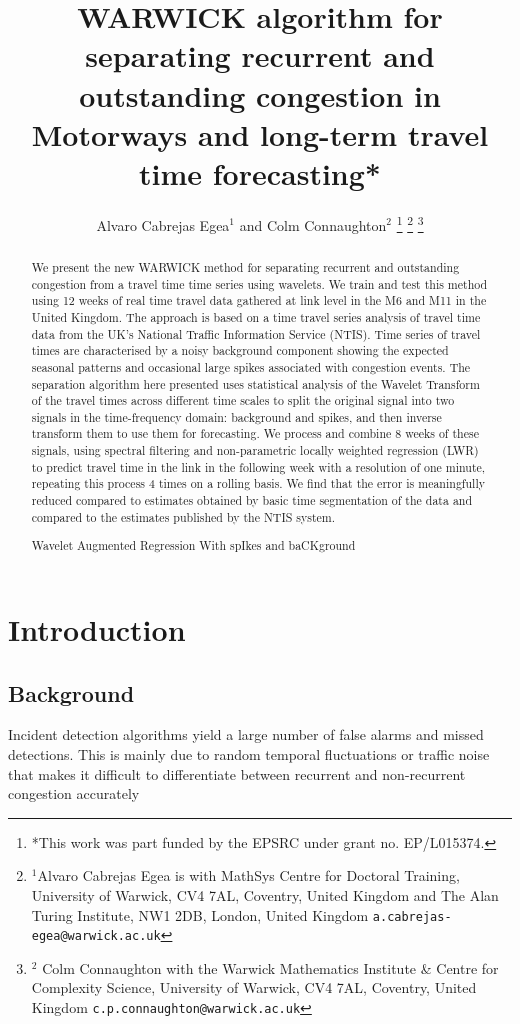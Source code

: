 \documentclass[letterpaper, 10 pt, conference]{ieeeconf}  %
\title{\LARGE \bf
WARWICK algorithm for separating recurrent and outstanding congestion in Motorways and long-term travel time forecasting*
}
\author{Alvaro Cabrejas Egea$^{1}$ and Colm Connaughton$^{2}$%
\thanks{*This work was part funded by the EPSRC under grant no. EP/L015374.}%
\thanks{$^{1}$Alvaro Cabrejas Egea is with MathSys Centre for Doctoral Training, University of Warwick, CV4 7AL, Coventry, United Kingdom and The Alan Turing Institute, NW1 2DB, London, United Kingdom
        {\tt\small a.cabrejas-egea@warwick.ac.uk}}%
\thanks{$^{2}$ Colm Connaughton with the Warwick Mathematics Institute \& Centre for Complexity Science, University of Warwick,
        CV4 7AL, Coventry, United Kingdom
        {\tt\small c.p.connaughton@warwick.ac.uk}}%
}
\begin{document}
\maketitle
\thispagestyle{empty}
\pagestyle{empty}


\begin{abstract}
We present the new WARWICK method for separating recurrent and outstanding congestion from a travel time time series using wavelets. 
We train and test this method using 12 weeks of real time travel data gathered at link level in the M6 and M11 in the United Kingdom.
The approach is based on a time travel series analysis of travel time data from the UK's National Traffic Information Service (NTIS).
Time series of travel times are characterised by a noisy background component showing the expected seasonal patterns and occasional large spikes associated with congestion events.
The separation algorithm here presented uses statistical analysis of the Wavelet Transform of the travel times across different time scales to split the original signal into two signals in the time-frequency domain: background and spikes, and then inverse transform them to use them for forecasting.
We process and combine 8 weeks of these signals, using spectral filtering and non-parametric locally weighted regression (LWR) to predict travel time in the link in the following week with a resolution of one minute, repeating this process 4 times on a rolling basis.
We find that the error is meaningfully reduced compared to estimates obtained by basic time segmentation of the data and compared to the estimates published by the NTIS system.

Wavelet
Augmented
Regression
With
spIkes and
baCKground

\end{abstract}

\section{Introduction} \label{Introduction}
\subsection{Background} \label{Background}
Incident detection algorithms yield a large number of false alarms and missed detections. This is mainly
due to random temporal fluctuations or traffic noise that
makes it difficult to differentiate between recurrent and
non-recurrent congestion accurately
\end{document}
